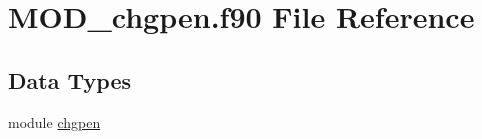\hypertarget{MOD__chgpen_8f90}{\section{M\-O\-D\-\_\-chgpen.\-f90 File Reference}
\label{MOD__chgpen_8f90}
}
\subsection*{Data Types}
\begin{DoxyCompactItemize}
\item 
module \hyperlink{classchgpen}{chgpen}
\end{DoxyCompactItemize}
